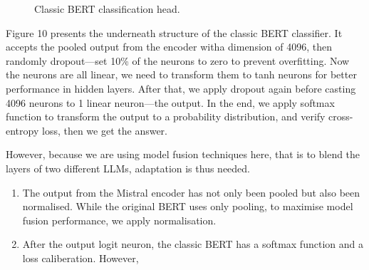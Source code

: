 \documentclass[12pt]{article}
\begin{document}
\begin{figure}[H]
\begin{adjustwidth}{-0.3cm}{0cm}
\begin{minipage}{1\textwidth}
\end{minipage}
\end{adjustwidth}
\caption{Classic BERT classification head.}
\label{fig:bert-classification-head}
\end{figure}

Figure 10 presents the underneath structure of the classic BERT classifier. It accepts the pooled output from the encoder witha dimension of 4096, then randomly dropout\;---\;set 10\% of the neurons to zero to prevent overfitting. Now the neurons are all linear, we need to transform them to tanh neurons for better performance in hidden layers. After that, we apply dropout again before casting 4096 neurons to 1 linear neuron\;---\;the output. In the end, we apply softmax function to transform the output to a probability distribution, and verify cross-entropy loss, then we get the answer.

However, because we are using model fusion techniques here, that is to blend the layers of two different LLMs, adaptation is thus needed.

\begin{enumerate}
  \item The output from the Mistral encoder has not only been pooled but also been normalised. While the original BERT uses only pooling, to maximise model fusion performance, we apply normalisation.
  \item After the output logit neuron, the classic BERT has a softmax function and a loss caliberation. However, 
\end{enumerate}
\end{document}
